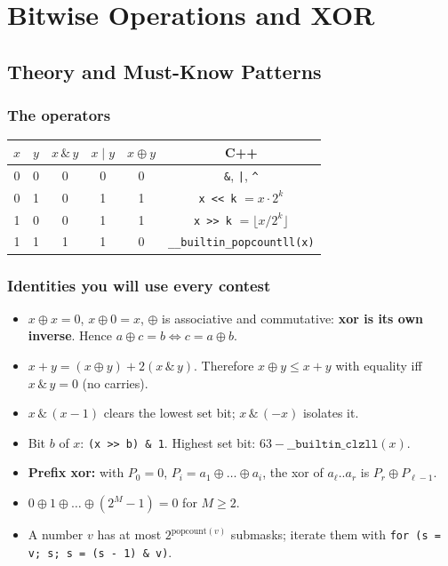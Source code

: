\chapter{Bitwise Operations and XOR}

\section{Theory and Must-Know Patterns}
\label{sec:bit-theory}

\subsection*{The operators}

\begin{center}
\renewcommand{\arraystretch}{1.2}
\begin{tabular}{cccccc}
\toprule
$x$ & $y$ & $x\,\&\,y$ & $x\mid y$ & $x\oplus y$ & C++ \\
\midrule
0&0&0&0&0& \texttt{\&}, \texttt{|}, \texttt{\^{}}\\
0&1&0&1&1& \texttt{x << k} $=x\cdot2^k$\\
1&0&0&1&1& \texttt{x >> k} $=\lfloor x/2^k\rfloor$\\
1&1&1&1&0& \texttt{\_\_builtin\_popcountll(x)}\\
\bottomrule
\end{tabular}
\end{center}

\subsection*{Identities you will use every contest}

\begin{itemize}
  \item $x\oplus x=0$, $x\oplus0=x$, $\oplus$ is associative and commutative:
        \textbf{xor is its own inverse}. Hence $a\oplus c=b\iff c=a\oplus b$.
  \item $x+y=(x\oplus y)+2(x\,\&\,y)$. Therefore $x\oplus y\le x+y$ with
        equality iff $x\,\&\,y=0$ (no carries).
  \item $x\,\&\,(x-1)$ clears the lowest set bit; $x\,\&\,(-x)$ isolates it.
  \item Bit $b$ of $x$: \texttt{(x >> b) \& 1}. Highest set bit:
        $63-\texttt{\_\_builtin\_clzll}(x)$.
  \item \textbf{Prefix xor:} with $P_0=0$, $P_i=a_1\oplus\dots\oplus a_i$, the
        xor of $a_\ell..a_r$ is $P_r\oplus P_{\ell-1}$.
  \item $0\oplus1\oplus\dots\oplus(2^M-1)=0$ for $M\ge2$.
  \item A number $v$ has at most $2^{\text{popcount}(v)}$ submasks; iterate
        them with \texttt{for (s = v; s; s = (s - 1) \& v)}.
\end{itemize}

